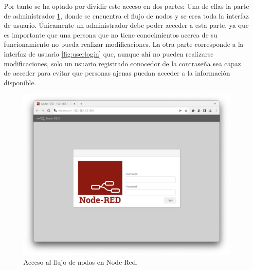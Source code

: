 Por tanto se ha optado por dividir este acceso en dos partes: Una de ellas la parte de administrador \ref{fig:adminlogin}, donde se encuentra el flujo de nodos y se crea toda la interfaz de usuario. Únicamente un administrador debe poder acceder a esta parte, ya que es importante que una persona que no tiene conocimientos acerca de su funcionamiento no pueda realizar modificaciones. La otra parte corresponde a la interfaz de usuario \ref{fig:userlogin} que, aunque ahí no pueden realizarse modificaciones, solo un usuario registrado conocedor de la contraseña sea capaz de acceder para evitar que personas ajenas puedan acceder a la información disponible.
\begin{figure} [h!]
  \begin{center}
    \includegraphics[width=12cm]{figs/adminlogin}
  \end{center}
  \caption{Acceso al flujo de nodos en Node-Red.}
  \label{fig:adminlogin}
\end{figure}

